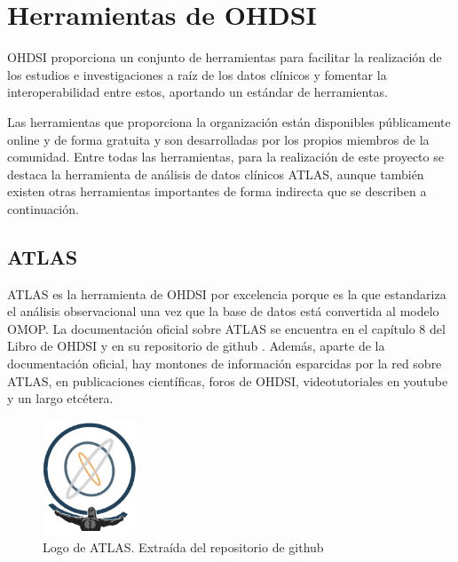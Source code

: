 
\section{Herramientas de OHDSI} \label{sec:07herramientas}

OHDSI proporciona un conjunto de herramientas para facilitar la realización de los estudios e investigaciones a raíz de los datos clínicos y fomentar la interoperabilidad entre estos, aportando un estándar de herramientas. 

Las herramientas que proporciona la organización están disponibles públicamente online y de forma gratuita y son desarrolladas por los propios miembros de la comunidad. Entre todas las herramientas, para la realización de este proyecto se destaca la herramienta de análisis de datos clínicos ATLAS, aunque también existen otras herramientas importantes de forma indirecta que se describen a continuación.

\subsection{ATLAS} \label{subsec:07ATLAS}

ATLAS es la herramienta de OHDSI por excelencia porque es la que estandariza el análisis observacional una vez que la base de datos está convertida al modelo OMOP. La documentación oficial sobre ATLAS se encuentra en el capítulo 8 del Libro de OHDSI y en su repositorio de github \parencite{githubATLAS}. Además, aparte de la documentación oficial, hay montones de información esparcidas por la red sobre ATLAS, en publicaciones científicas, foros de OHDSI, videotutoriales en youtube y un largo etcétera.

\begin{figure}[H]
\centering
\includegraphics[width=0.25\textwidth]{figures/ATLASlogo.png}
     \caption{Logo de ATLAS. Extraída del repositorio de github \parencite{githubATLAS}}
    \label{fig:ATLASlogo}
\end{figure}

